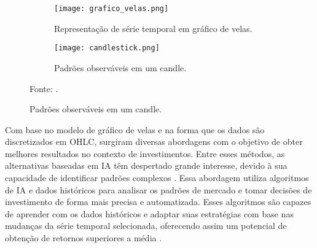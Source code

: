 \begin{figure}[htbp]
     \centering
     \caption{Gráfico de velas e suas características observáveis.}
     \begin{subfigure}[b]{0.48\textwidth}
         \centering
         \texttt{[image: grafico\_velas.png]}
         \caption{Representação de série temporal em gráfico de velas.}
         \label{fig:grafico_velas} 
     \end{subfigure}
     \hfill
     \begin{subfigure}[b]{0.48\textwidth}
         \centering
         \texttt{[image: candlestick.png]}
         \caption{Padrões observáveis em um candle.}
         \label{fig:candle_definition}
     \end{subfigure}

     Fonte: .
\end{figure}
Com base no modelo de gráfico de velas e na forma que os dados são discretizados em \ac{OHLC}, surgiram diversas abordagens com o objetivo de obter melhores resultados no contexto de investimentos. Entre esses métodos, as alternativas baseadas em \ac{IA} têm despertado grande interesse, devido à sua capacidade de identificar padrões complexos \cite{dwivedi2021artificial}. Essa abordagem utiliza algoritmos de \ac{IA} e dados históricos para analisar os padrões de mercado e tomar decisões de investimento de forma mais precisa e automatizada. Esses algoritmos são capazes de aprender com os dados históricos e adaptar suas estratégias com base nas mudanças da série temporal selecionada, oferecendo assim um potencial de obtenção de retornos superiores a média \cite{strader2020machine}.

